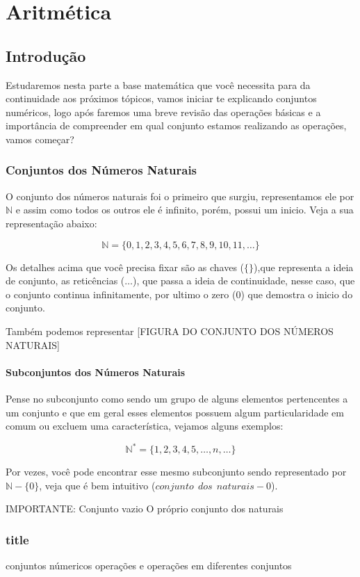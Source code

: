 \chapter{Aritmética}
\section{Introdução}
Estudaremos nesta parte a base matemática que você necessita para da continuidade aos próximos tópicos, vamos iniciar te explicando conjuntos numéricos, logo após faremos uma breve revisão das operações básicas e a importância de compreender em qual conjunto estamos realizando as operações, vamos começar?
\subsection{Conjuntos dos Números Naturais}
O conjunto dos números naturais foi o primeiro que surgiu, representamos ele por $\mathbb{N}$ e assim como todos os outros ele é infinito, porém, possui um inicio. Veja a sua representação abaixo:

$$ \mathbb{N}= \{0,1,2,3,4,5,6,7,8,9,10,11, \ldots \}$$

Os detalhes acima que você precisa fixar são as chaves ($\{ \}$),que representa a ideia de conjunto, as reticências ($\ldots$), que passa a ideia de continuidade, nesse caso, que o conjunto continua infinitamente, por ultimo o zero ($0$) que demostra o inicio do conjunto.

Também podemos representar 
[FIGURA DO CONJUNTO DOS NÚMEROS NATURAIS]

\subsubsection{Subconjuntos dos Números Naturais}
Pense no subconjunto como sendo um grupo de alguns elementos pertencentes a um conjunto e que em geral esses elementos possuem algum particularidade em comum ou excluem uma característica, vejamos alguns exemplos:

\begin{example}
	$$\mathbb{N}^{*}=\{1,2,3,4,5,\ldots,n,\ldots\}$$
	
	Por vezes, você pode encontrar esse mesmo subconjunto sendo representado por $\mathbb{N}-\{ 0 \}$, veja que é bem intuitivo ($conjunto~~dos~~naturais - 0$).
\end{example}


IMPORTANTE:
Conjunto vazio
O próprio conjunto dos naturais

\subsection{title}


conjuntos númericos
operações e 
operações em diferentes conjuntos

